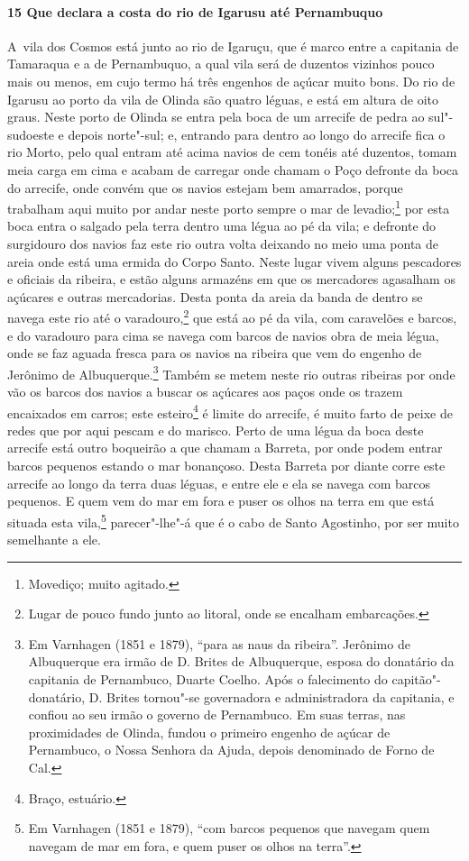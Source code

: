 \paragraph{15 Que declara a costa do rio de Igarusu até Pernambuquo}

\mbox{A vila} dos Cosmos está junto ao rio de Igaruçu, que é marco entre a capitania de Tamaraqua
e a de Pernambuquo, a qual vila será de duzentos vizinhos pouco mais ou menos, em cujo
termo há três engenhos de açúcar muito bons. Do rio de Igarusu ao porto da vila de Olinda
são quatro léguas, e está em altura de oito graus. Neste porto de Olinda se entra pela
boca de um arrecife de pedra ao sul"-sudoeste e depois norte"-sul; e, entrando para dentro
ao longo do arrecife fica o rio Morto, pelo qual entram até acima navios de cem tonéis até
duzentos, tomam meia carga em cima e acabam de carregar onde chamam o Poço defronte da
boca do arrecife, onde convém que os navios estejam bem amarrados, porque trabalham aqui
muito por andar neste porto sempre o mar de levadio;\footnote{ Movediço; muito agitado.}
por esta boca entra o salgado pela terra dentro uma légua ao pé da vila; e defronte do
surgidouro dos navios faz este rio outra volta deixando no meio uma ponta de areia onde
está uma ermida do Corpo Santo. Neste lugar vivem alguns pescadores e oficiais da ribeira,
e estão alguns armazéns em que os mercadores agasalham os açúcares e outras mercadorias.
Desta ponta da areia da banda de dentro se navega este rio até o varadouro,\footnote{ Lugar
de pouco fundo junto ao litoral, onde se encalham embarcações.} que está ao pé da vila,
com caravelões e barcos, e do varadouro para cima se navega com barcos de navios obra de
meia légua, onde se faz aguada fresca para os navios na ribeira que vem do engenho de
Jerônimo de Albuquerque.\footnote{ Em Varnhagen (1851 e 1879), ``para as naus da
ribeira''. Jerônimo de Albuquerque era irmão de D. Brites de Albuquerque, esposa do
donatário da capitania de Pernambuco, Duarte Coelho. Após o falecimento do
capitão"-donatário, D. Brites tornou"-se governadora e administradora da capitania, e
confiou ao seu irmão o governo de Pernambuco. Em suas terras, nas proximidades de Olinda,
fundou o primeiro engenho de açúcar de Pernambuco, o Nossa Senhora da Ajuda, depois
denominado de Forno de Cal.} Também se metem neste rio outras ribeiras por onde vão os
barcos dos navios a buscar os açúcares aos paços onde os trazem encaixados em carros; este
esteiro\footnote{ Braço, estuário.} é limite do arrecife, é muito farto de peixe de redes
que por aqui pescam e do marisco. Perto de uma légua da boca deste arrecife está outro
boqueirão a que chamam a Barreta, por onde podem entrar barcos pequenos estando o mar
bonançoso. Desta Barreta por diante corre este arrecife ao longo da terra duas léguas, e
entre ele e ela se navega com barcos pequenos. E quem vem do mar em fora e puser os olhos
na terra em que está situada esta vila,\footnote{ Em Varnhagen (1851 e 1879), ``com barcos
pequenos que navegam quem navegam de mar em fora, e quem puser os olhos na terra''.}
parecer"-lhe"-á que é o cabo de Santo Agostinho, por ser muito semelhante a ele.

